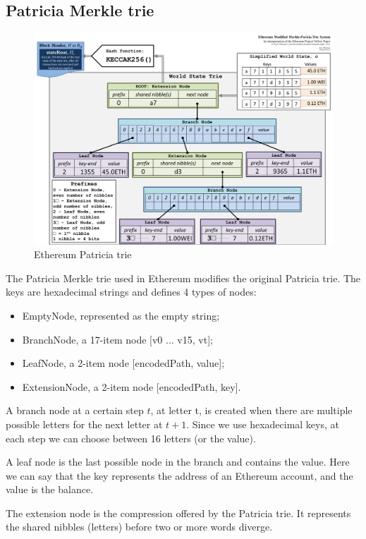 \subsection{Patricia Merkle trie}
\label{Merkle:ethereum}
\begin{figure}[H]
    \centering
\includegraphics[width=0.9\linewidth]{background/ethereum_mpt.png}
    \caption{Ethereum Patricia trie}
    \label{fig:eth_mpt}
\end{figure}

The Patricia Merkle trie used in Ethereum modifies the original Patricia trie. The keys are hexadecimal strings and defines 4 types of nodes: 
\begin{itemize}
    \item EmptyNode, represented as the empty string;
    \item BranchNode, a 17-item node [v0 ... v15, vt];
    \item LeafNode, a 2-item node [encodedPath, value];
    \item ExtensionNode, a 2-item node [encodedPath, key].
\end{itemize}
A branch node at a certain step $t$, at letter t, is created when there are multiple possible letters for the next letter at $t+1$. Since we use hexadecimal keys, at each step we can choose between 16 letters (or the value).

A leaf node is the last possible node in the branch and contains the value. Here we can say that the key represents the address of an Ethereum account, and the value is the balance. 

The extension node is the compression offered by the Patricia trie. It represents the shared nibbles (letters) before two or more words diverge. 



